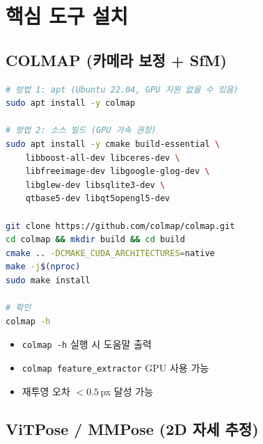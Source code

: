 \documentclass[11pt, a4paper]{report}
\begin{document}
\chapter{핵심 도구 설치}
\label{ch:tools}

\section{COLMAP (카메라 보정 + SfM)}

\begin{termbox}[title={COLMAP 설치}]
\begin{lstlisting}[language=bash, numbers=none]
# 방법 1: apt (Ubuntu 22.04, GPU 지원 없을 수 있음)
sudo apt install -y colmap

# 방법 2: 소스 빌드 (GPU 가속 권장)
sudo apt install -y cmake build-essential \
    libboost-all-dev libceres-dev \
    libfreeimage-dev libgoogle-glog-dev \
    libglew-dev libsqlite3-dev \
    qtbase5-dev libqt5opengl5-dev

git clone https://github.com/colmap/colmap.git
cd colmap && mkdir build && cd build
cmake .. -DCMAKE_CUDA_ARCHITECTURES=native
make -j$(nproc)
sudo make install

# 확인
colmap -h
\end{lstlisting}
\end{termbox}

\begin{checklistbox}[title={COLMAP 설치 확인}]
\begin{itemize}[nosep]
  \item[$\square$] \texttt{colmap -h} 실행 시 도움말 출력
  \item[$\square$] \texttt{colmap feature\_extractor} GPU 사용 가능
  \item[$\square$] 재투영 오차 $< 0.5$\,px 달성 가능
\end{itemize}
\end{checklistbox}


\section{ViTPose / MMPose (2D 자세 추정)}
\end{document}
